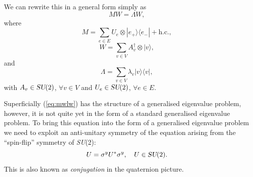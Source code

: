\documentclass[12pt]{amsart}
\def\su2{\textsl{SU}(2)}
\theoremstyle{definition}
\theoremstyle{remark}
\numberwithin{equation}{section}
\begin{document}
We can rewrite this in a general form simply as
\begin{equation}\label{eq:mwlw}
	MW = \Lambda W,
\end{equation}
where
\begin{equation}
	M = \sum_{e\in E} U_{e} \otimes |e_+\rangle\langle e_-| + \text{h.c.},
\end{equation}
\begin{equation}
	W = \sum_{v\in V} A_v^\dag \otimes |v\rangle,
\end{equation}
and
\begin{equation}
	\Lambda = \sum_{v\in V} \lambda_v |v\rangle\langle v|,
\end{equation}
with $A_v\in \su2$, $\forall v\in V$ and $U_e\in \su2$, $\forall e\in E$.

Superficially (\ref{eq:mwlw}) has the structure of a generalised eigenvalue problem, however, it is not quite yet in the form of a standard generalised eigenvalue problem. To bring this equation into the form of a generalised eigenvalue problem we need to exploit an anti-unitary symmetry of the equation arising from the ``spin-flip'' symmetry of \su2:
\begin{equation}
	U = \sigma^y U^* \sigma^y,\quad U\in \su2.
\end{equation}
This is also known as \emph{conjugation} in the quaternion picture. 
\end{document}
